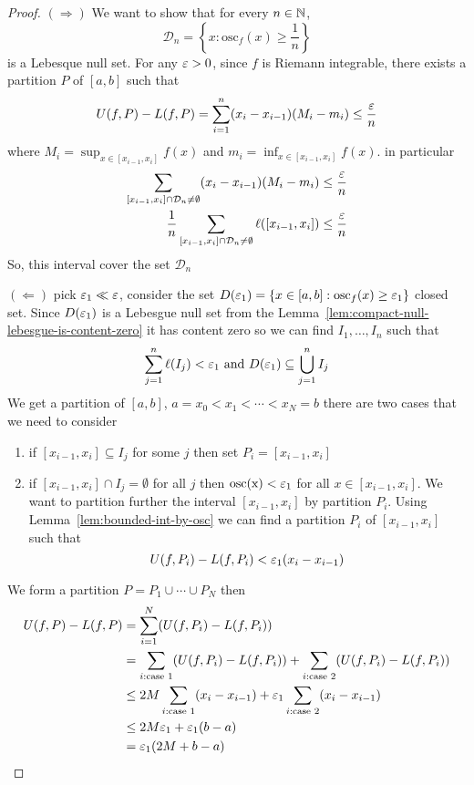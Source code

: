 \begin{proof}
  $(\Rightarrow)$ We want to show that for every $n \in \mathbb N$, 
  \[\mathcal{D}_n = \left\{x : \mathrm{osc}_f(x) \ge \frac1n\right\}\]
  is a Lebesque null set. For any $\varepsilon > 0$, since $f$ is Riemann integrable, 
  there exists a partition $P$ of $[a, b]$ such that 
  \[U(f, P) - L(f, P) = \sum_{i = 1}^n (x_i - x_{i-1})(M_i - m_i) \le \frac{\varepsilon} n\]
  where $M_i = \sup_{x\in[x_{i-1}, x_i]}f(x)$ and $m_i = \inf_{x\in[x_{i-1}, x_i]}f(x)$.
  in particular
  \begin{align*}
    \sum_{[x_{i-1}, x_i]\cap \mathcal{D}_n \neq \emptyset}(x_i - x_{i-1})(M_i - m_i) &\le \frac{\varepsilon} n\\
    \frac1n\sum_{[x_{i-1}, x_i]\cap \mathcal{D}_n \neq \emptyset} \ell([x_{i-1}, x_i]) &\le \frac{\varepsilon} n
  \end{align*}
  So, this interval cover the set $\mathcal{D}_n$

  $(\Leftarrow)$ pick $\varepsilon_1 \ll \varepsilon$, consider the set $D(\varepsilon_1) = \{x \in [a, b] : \mathrm{osc}_f(x) \ge \varepsilon_1\}$ closed set.
  Since $D(\varepsilon_1)$ is a Lebesgue null set from the Lemma~\ref{lem:compact-null-lebesgue-is-content-zero}
  it has content zero so we can find $I_1, \dotsc, I_n$ 
  such that 
  \[\sum_{j=1}^n \ell(I_j) < \varepsilon_1 \text{ and } D(\varepsilon_1) \subseteq \bigcup_{j=1}^n I_j\]
  We get a partition of $[a, b]$, $a = x_0 < x_1 < \cdots < x_N = b$ 
  there are two cases that we need to consider
  \begin{enumerate}[1)]
    \item if $[x_{i-1}, x_i] \subseteq I_j$ for some $j$ then set $P_i = [x_{i-1}, x_i]$ 
    \item if $[x_{i-1}, x_i] \cap I_j = \emptyset$ for all $j$ then 
    $\mathrm{osc(x)} < \varepsilon_1$ for all $x \in [x_{i-1}, x_i]$.
    We want to partition further the interval $[x_{i-1}, x_i]$ by partition $P_i$.
    Using Lemma~\ref{lem:bounded-int-by-osc} we can find a partition $P_i$ of $[x_{i-1}, x_i]$ such that
    \[U(f, P_i) - L(f, P_i) < \varepsilon_1(x_i - x_{i-1})\]
  \end{enumerate}
  We form a partition $P = P_1 \cup \cdots \cup P_N$ then
  \begin{align*}
    U(f, P) - L(f, P) &= \sum_{i=1}^{N} (U(f, P_i) - L(f, P_i))\\
    &= \sum_{i: \text{case }1} (U(f, P_i) - L(f, P_i)) + \sum_{i: \text{case }2} (U(f, P_i) - L(f, P_i))\\
    &\le 2M \sum_{i: \text{case }1} (x_i - x_{i-1}) + \varepsilon_1\sum_{i: \text{case }2} (x_i - x_{i-1})\\
    &\le 2M\varepsilon_1 + \varepsilon_1(b-a) \\
    &= \varepsilon_1(2M + b-a)
  \end{align*}
\end{proof}